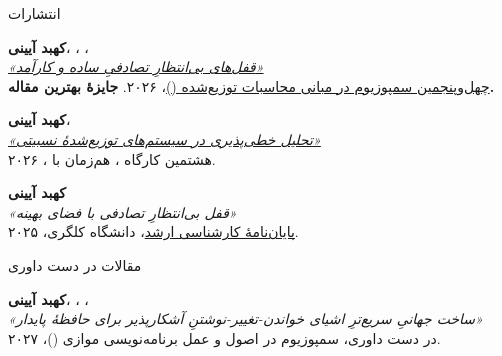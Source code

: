 \documentclass[11pt]{article}
\begin{document}
\begin{faSection}{انتشارات}

\textbf{کهبد آیینی}، ، ، \\
\href{https://dl.acm.org/doi/10.1145/3796701.3815952}{\textit{«قفل‌های بی‌انتظارِ تصادفیِ ساده و کارآمد»}}\\
\href{https://www.podc.org/podc2026/}{چهل‌وپنجمین سمپوزیوم  در مبانی محاسبات توزیع‌شده ()}، ۲۰۲۶. \textbf{جایزۀ بهترین مقاله.}

\vspace{0.5em}
\textbf{کهبد آیینی}، \\
\href{https://dl.acm.org/doi/10.1145/3820355.3820388}{\textit{«تحلیل خطی‌پذیری در سیستم‌های توزیع‌شدۀ نسبیتی»}}\\
هشتمین کارگاه ، هم‌زمان با ، ۲۰۲۶.

\vspace{0.5em}
\textbf{کهبد آیینی}\\
\textit{«قفل بی‌انتظارِ تصادفی با فضای بهینه»}\\
\href{https://ucalgary.scholaris.ca/bitstreams/5ae5cf8f-5009-4db3-b91e-d3dbb679b5bf/download}{پایان‌نامۀ کارشناسی ارشد}، دانشگاه کلگری، ۲۰۲۵.

\end{faSection}

\begin{faSection}{مقالات در دست داوری}

\textbf{کهبد آیینی}، ، ، \\
\textit{«ساخت جهانیِ سریع‌ترِ اشیای خواندن-تغییر-نوشتنِ آشکارپذیر برای حافظۀ پایدار»}\\
در دست داوری، سمپوزیوم  در اصول و عمل برنامه‌نویسی موازی ()، ۲۰۲۷.

\end{faSection}
\end{document}
